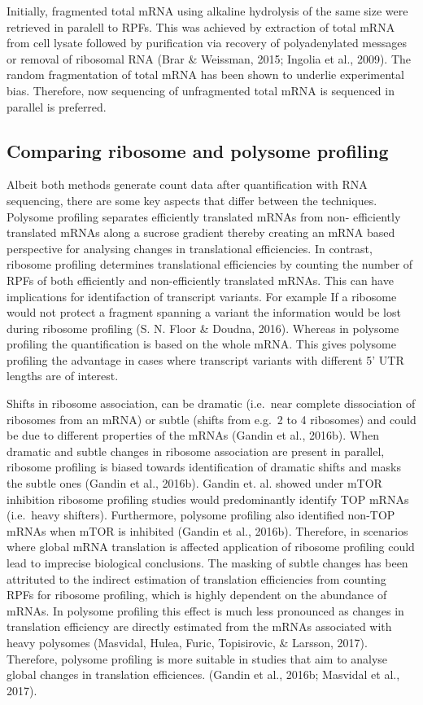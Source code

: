 \documentclass[12pt,openany]{book}
\begin{document}
Initially, fragmented total mRNA using alkaline hydrolysis of the same
size were retrieved in paralell to RPFs. This was achieved by extraction
of total mRNA from cell lysate followed by purification via recovery of
polyadenylated messages or removal of ribosomal RNA (Brar \& Weissman,
2015; Ingolia et al., 2009). The random fragmentation of total mRNA has
been shown to underlie experimental bias. Therefore, now sequencing of
unfragmented total mRNA is sequenced in parallel is preferred.

\subsection{Comparing ribosome and polysome profiling}

Albeit both methods generate count data after quantification with RNA
sequencing, there are some key aspects that differ between the
techniques. Polysome profiling separates efficiently translated mRNAs
from non- efficiently translated mRNAs along a sucrose gradient thereby
creating an mRNA based perspective for analysing changes in
translational efficiencies. In contrast, ribosome profiling determines
translational efficiencies by counting the number of RPFs of both
efficiently and non-efficiently translated mRNAs. This can have
implications for identifaction of transcript variants. For example If a
ribosome would not protect a fragment spanning a variant the information
would be lost during ribosome profiling (S. N. Floor \& Doudna, 2016).
Whereas in polysome profiling the quantification is based on the whole
mRNA. This gives polysome profiling the advantage in cases where
transcript variants with different 5' UTR lengths are of interest.

Shifts in ribosome association, can be dramatic (i.e.~near complete
dissociation of ribosomes from an mRNA) or subtle (shifts from e.g.~2 to
4 ribosomes) and could be due to different properties of the mRNAs
(Gandin et al., 2016b). When dramatic and subtle changes in ribosome
association are present in parallel, ribosome profiling is biased
towards identification of dramatic shifts and masks the subtle ones
(Gandin et al., 2016b). Gandin et. al. showed under mTOR inhibition
ribosome profiling studies would predominantly identify TOP mRNAs
(i.e.~heavy shifters). Furthermore, polysome profiling also identified
non-TOP mRNAs when mTOR is inhibited (Gandin et al., 2016b). Therefore,
in scenarios where global mRNA translation is affected application of
ribosome profiling could lead to imprecise biological conclusions. The
masking of subtle changes has been attrituted to the indirect estimation
of translation efficiencies from counting RPFs for ribosome profiling,
which is highly dependent on the abundance of mRNAs. In polysome
profiling this effect is much less pronounced as changes in translation
efficiency are directly estimated from the mRNAs associated with heavy
polysomes (Masvidal, Hulea, Furic, Topisirovic, \& Larsson, 2017).
Therefore, polysome profiling is more suitable in studies that aim to
analyse global changes in translation efficiences. (Gandin et al.,
2016b; Masvidal et al., 2017).
\end{document}
